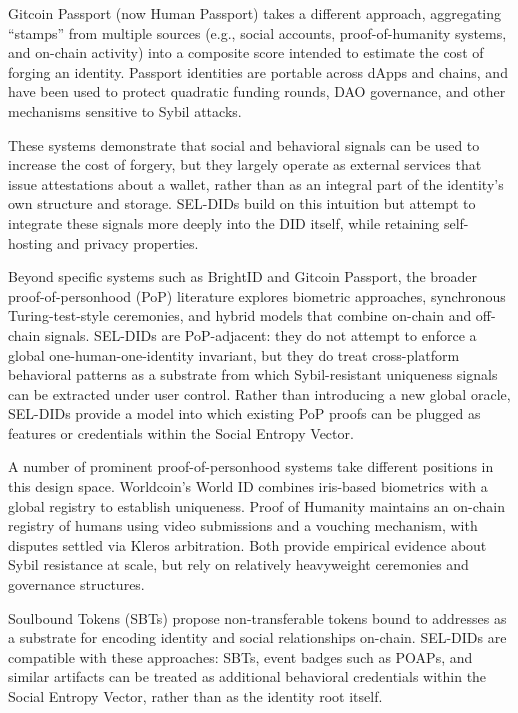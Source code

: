\documentclass[11pt]{article}
\begin{document}
Gitcoin Passport (now Human Passport) takes a different approach, aggregating ``stamps'' from multiple sources (e.g., social accounts, proof-of-humanity systems, and on-chain activity) into a composite score intended to estimate the cost of forging an identity.\cite{gitcoin_passport_blog,gitcoin_cost_of_forgery} Passport identities are portable across dApps and chains, and have been used to protect quadratic funding rounds, DAO governance, and other mechanisms sensitive to Sybil attacks.

These systems demonstrate that social and behavioral signals can be used to increase the cost of forgery, but they largely operate as external services that issue attestations about a wallet, rather than as an integral part of the identity's own structure and storage. SEL-DIDs build on this intuition but attempt to integrate these signals more deeply into the DID itself, while retaining self-hosting and privacy properties.

Beyond specific systems such as BrightID and Gitcoin Passport, the broader proof-of-personhood (PoP) literature explores biometric approaches, synchronous Turing-test-style ceremonies, and hybrid models that combine on-chain and off-chain signals. SEL-DIDs are PoP-adjacent: they do not attempt to enforce a global one-human-one-identity invariant, but they do treat cross-platform behavioral patterns as a substrate from which Sybil-resistant uniqueness signals can be extracted under user control. Rather than introducing a new global oracle, SEL-DIDs provide a model into which existing PoP proofs can be plugged as features or credentials within the Social Entropy Vector.

A number of prominent proof-of-personhood systems take different positions in this design space. Worldcoin's World ID combines iris-based biometrics with a global registry to establish uniqueness.\cite{worldcoin_world_id} Proof of Humanity maintains an on-chain registry of humans using video submissions and a vouching mechanism, with disputes settled via Kleros arbitration.\cite{proof_of_humanity} Both provide empirical evidence about Sybil resistance at scale, but rely on relatively heavyweight ceremonies and governance structures.

Soulbound Tokens (SBTs) propose non-transferable tokens bound to addresses as a substrate for encoding identity and social relationships on-chain.\cite{soulbound_tokens} SEL-DIDs are compatible with these approaches: SBTs, event badges such as POAPs, and similar artifacts can be treated as additional behavioral credentials within the Social Entropy Vector, rather than as the identity root itself.
\end{document}

